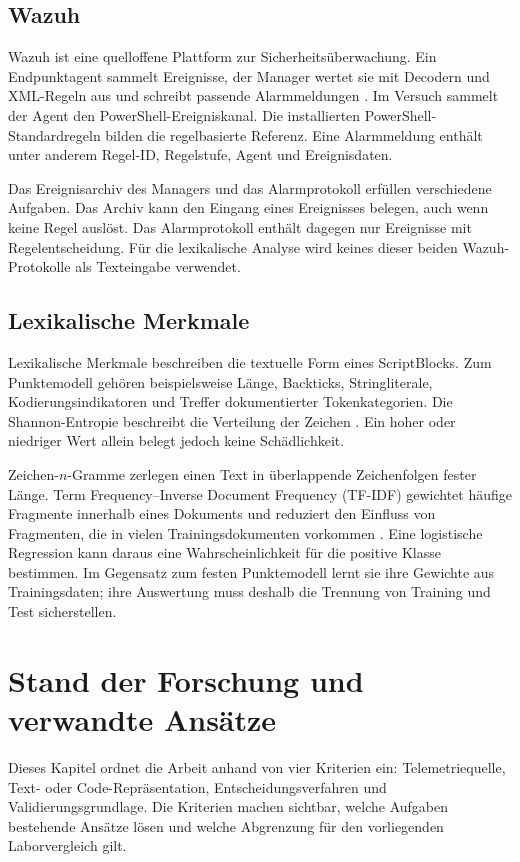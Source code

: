 \documentclass[12pt,a4paper,oneside,parskip=half]{scrreprt}
\begin{document}
\section{Wazuh}
Wazuh ist eine quelloffene Plattform zur Sicherheitsüberwachung. Ein Endpunktagent sammelt Ereignisse, der Manager wertet sie mit Decodern und XML-Regeln aus und schreibt passende Alarmmeldungen \cite{wazuh-log-collection,wazuh-rules}. Im Versuch sammelt der Agent den PowerShell-Ereigniskanal. Die installierten PowerShell-Standardregeln bilden die regelbasierte Referenz. Eine Alarmmeldung enthält unter anderem Regel-ID, Regelstufe, Agent und Ereignisdaten.

Das Ereignisarchiv des Managers und das Alarmprotokoll erfüllen verschiedene Aufgaben. Das Archiv kann den Eingang eines Ereignisses belegen, auch wenn keine Regel auslöst. Das Alarmprotokoll enthält dagegen nur Ereignisse mit Regelentscheidung. Für die lexikalische Analyse wird keines dieser beiden Wazuh-Protokolle als Texteingabe verwendet.

\section{Lexikalische Merkmale}
Lexikalische Merkmale beschreiben die textuelle Form eines ScriptBlocks. Zum Punktemodell gehören beispielsweise Länge, Backticks, Stringliterale, Kodierungsindikatoren und Treffer dokumentierter Tokenkategorien. Die Shannon-Entropie beschreibt die Verteilung der Zeichen \cite{shannon1948}. Ein hoher oder niedriger Wert allein belegt jedoch keine Schädlichkeit.

Zeichen-\(n\)-Gramme zerlegen einen Text in überlappende Zeichenfolgen fester Länge. Term Frequency--Inverse Document Frequency (TF-IDF) gewichtet häufige Fragmente innerhalb eines Dokuments und reduziert den Einfluss von Fragmenten, die in vielen Trainingsdokumenten vorkommen \cite{salton1988}. Eine logistische Regression kann daraus eine Wahrscheinlichkeit für die positive Klasse bestimmen. Im Gegensatz zum festen Punktemodell lernt sie ihre Gewichte aus Trainingsdaten; ihre Auswertung muss deshalb die Trennung von Training und Test sicherstellen.
\chapter{Stand der Forschung und verwandte Ansätze}

Dieses Kapitel ordnet die Arbeit anhand von vier Kriterien ein: Telemetriequelle, Text- oder Code-Repräsentation, Entscheidungsverfahren und Validierungsgrundlage. Die Kriterien machen sichtbar, welche Aufgaben bestehende Ansätze lösen und welche Abgrenzung für den vorliegenden Laborvergleich gilt.
\end{document}

